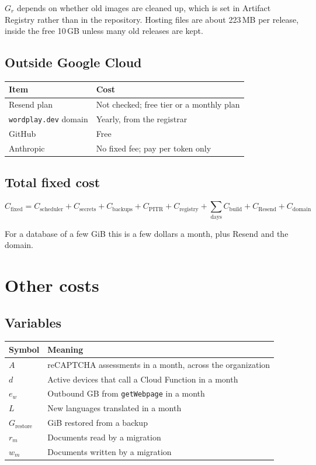 \documentclass[11pt]{article}
\begin{document}
$G_r$ depends on whether old images are cleaned up, which is set in Artifact
Registry rather than in the repository. Hosting files are about 223\,MB per
release, inside the free 10\,GB unless many old releases are kept.

\subsection{Outside Google Cloud}

\begin{center}
\begin{tabular}{ll}
\toprule
Item & Cost \\
\midrule
Resend plan & Not checked; free tier or a monthly plan \\
\texttt{wordplay.dev} domain & Yearly, from the registrar \\
GitHub & Free \\
Anthropic & No fixed fee; pay per token only \\
\bottomrule
\end{tabular}
\end{center}

\subsection{Total fixed cost}

\[
C_{\text{fixed}} =
C_{\text{scheduler}} + C_{\text{secrets}} + C_{\text{backups}}
+ C_{\text{PITR}} + C_{\text{registry}} + \sum_{\text{days}} C_{\text{build}}
+ C_{\text{Resend}} + C_{\text{domain}}
\]

For a database of a few GiB this is a few dollars a month, plus Resend and the
domain.

\section{Other costs}

\subsection{Variables}

\begin{center}
\begin{tabular}{ll}
\toprule
Symbol & Meaning \\
\midrule
$A$ & reCAPTCHA assessments in a month, across the organization \\
$d$ & Active devices that call a Cloud Function in a month \\
$e_w$ & Outbound GB from \texttt{getWebpage} in a month \\
$L$ & New languages translated in a month \\
$G_{\text{restore}}$ & GiB restored from a backup \\
$r_m$ & Documents read by a migration \\
$w_m$ & Documents written by a migration \\
\bottomrule
\end{tabular}
\end{center}
\end{document}
